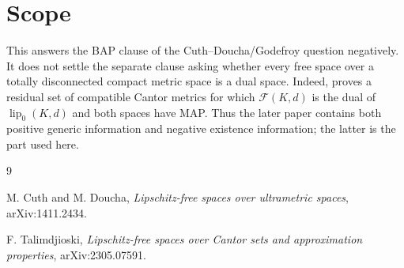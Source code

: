 \documentclass[11pt]{article}
\newcommand{\F}{\mathcal F}
\begin{document}
\section*{Scope}

This answers the BAP clause of the Cuth--Doucha/Godefroy question negatively.
It does not settle the separate clause asking whether every free space over a
totally disconnected compact metric space is a dual space. Indeed,
\cite[Corollary labeled \texttt{cor:dualmapresidual}]{talimdjioski} proves a
residual set of compatible Cantor metrics for which \(\F(K,d)\) is the dual of
\(\operatorname{lip}_0(K,d)\) and both spaces have MAP. Thus the later paper
contains both positive generic information and negative existence information;
the latter is the part used here.

\begin{thebibliography}{9}

M. Cuth and M. Doucha,
\emph{Lipschitz-free spaces over ultrametric spaces},
arXiv:1411.2434.

F. Talimdjioski,
\emph{Lipschitz-free spaces over Cantor sets and approximation properties},
arXiv:2305.07591.

\end{thebibliography}
\end{document}
